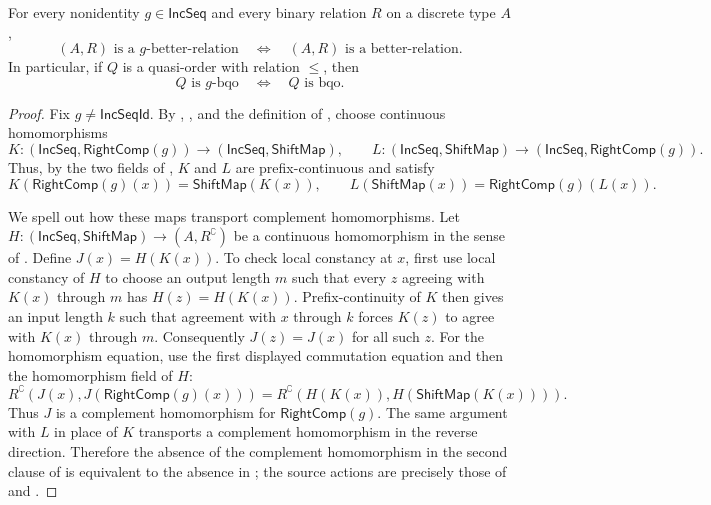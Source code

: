 \begin{theorem}[g-BQO]
For every nonidentity $g\in\mathsf{IncSeq}$ and every binary relation $R$
on a discrete type $A$,
\[
(A,R)\text{ is a $g$-better-relation}
\quad\Longleftrightarrow\quad
(A,R)\text{ is a better-relation}.
\]
In particular, if $Q$ is a quasi-order with relation $\leq$, then
\[
Q\text{ is $g$-bqo}\quad\Longleftrightarrow\quad Q\text{ is bqo}.
\]
\end{theorem}
\begin{proof}
Fix $g\neq\mathsf{IncSeqId}$.  By ,
, and the definition of , choose
continuous homomorphisms
\[
 K:(\mathsf{IncSeq},\mathsf{RightComp}(g))\longrightarrow
       (\mathsf{IncSeq},\mathsf{ShiftMap}),
 \qquad
 L:(\mathsf{IncSeq},\mathsf{ShiftMap})\longrightarrow
       (\mathsf{IncSeq},\mathsf{RightComp}(g)).
\]
Thus, by the two fields of , $K$ and $L$ are
prefix-continuous and satisfy
\[
 K(\mathsf{RightComp}(g)(x))=\mathsf{ShiftMap}(K(x)),
 \qquad
 L(\mathsf{ShiftMap}(x))=\mathsf{RightComp}(g)(L(x)).
\]

We spell out how these maps transport complement homomorphisms.  Let
$H:(\mathsf{IncSeq},\mathsf{ShiftMap})\to(A,R^{\complement})$ be a
continuous homomorphism in the sense of .  Define
$J(x)=H(K(x))$.  To check local constancy at $x$, first use local constancy
of $H$ to choose an output length $m$ such that every $z$ agreeing with
$K(x)$ through $m$ has $H(z)=H(K(x))$.  Prefix-continuity of $K$ then gives
an input length $k$ such that agreement with $x$ through $k$ forces
$K(z)$ to agree with $K(x)$ through $m$.  Consequently $J(z)=J(x)$ for
all such $z$.  For the homomorphism equation, use the first displayed
commutation equation and then the homomorphism field of $H$:
\[
 R^{\complement}(J(x),J(\mathsf{RightComp}(g)(x)))
 =R^{\complement}(H(K(x)),H(\mathsf{ShiftMap}(K(x)))) .
\]
Thus $J$ is a complement homomorphism for $\mathsf{RightComp}(g)$.  The
same argument with $L$ in place of $K$ transports a complement homomorphism
in the reverse direction.  Therefore the absence of the complement
homomorphism in the second clause of  is equivalent to
the absence in ; the source actions are precisely those
of  and .


\end{proof}
